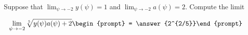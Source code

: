 \documentclass{ximera}
\author{Matthew Carr}
\begin{document}
\begin{exercise}
Suppose that $\lim_{\psi\to-2}y(\psi)=1$ and $\lim_{\psi\to-2}a(\psi)=2$. Compute the limit

\[
\lim_{\psi\to -2 } \sqrt[5]{y(\psi)a(\psi)+2}\begin{prompt} = \answer{2^{2/5}}\end{prompt}
\]
\end{exercise}
\end{document}
